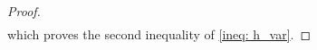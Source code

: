 \documentclass[10pt]{article}
\theoremstyle{remark}
\newcommand{\E}{\mathbb{E}}
\newcommand{\norm}[1]{\left\|#1\right\|}
\newcommand{\bfone}{\mathbf{1}}
\begin{document}
\begin{proof}
\begin{align*}
\end{align*}
which proves the second inequality of \eqref{ineq: h_var}.
\end{proof}
\end{document}
